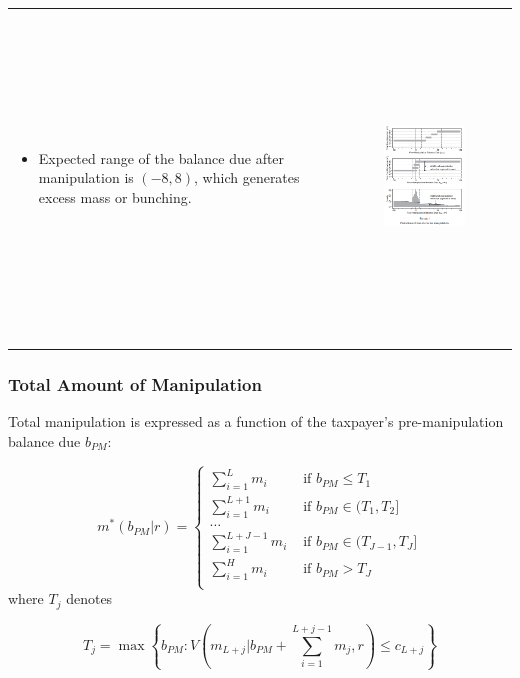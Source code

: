 \documentclass[dvipdfmx,12pt]{beamer}
\begin{document}
\begin{frame}
  \begin{tabular}{ll}
    \begin{minipage}[H]{0.4\textwidth}
      \begin{itemize}
        \item Expected range of the balance due after manipulation is
        $(-8, 8)$, which generates excess mass or bunching.
      \end{itemize}
    \end{minipage} &
    \begin{minipage}[H]{0.5\textwidth}
      \begin{figure}
        \includegraphics[width = 6cm, height = 8cm]{fig_tab/ARJ_F1.png}
      \end{figure}
      \end{minipage}
  \end{tabular}
\end{frame}
\begin{frame}\frametitle{Total Amount of Manipulation}
  Total manipulation is expressed as a function of the taxpayer's
  pre-manipulation balance due $b_{PM}$:

  \[
  m^* (b_{PM} | r) = \begin{cases}
  \sum _{i=1}^L m_i & \text{ if }b_{PM} \leq T_1 \\
  \sum _{i=1}^{L+1} m_i & \text{ if }b_{PM} \in (T_1, T_2] \\
  \dots \\
  \sum _{i=1}^{L+J-1} m_i & \text{ if }b_{PM} \in (T_{J-1}, T_J] \\
  \sum _{i=1}^{H} m_i & \text{ if }b_{PM} > T_J \\
\end{cases}
  \]
   where $T_j$ denotes

   \[
   T_j = \max \left \{ b_{PM} : V \left( m_{L + j} | b_{PM}
   + \sum_{i=1}^{L+j-1} m_j, r \right) \leq c_{L+j} \right \}
   \]
\end{frame}
\end{document}

